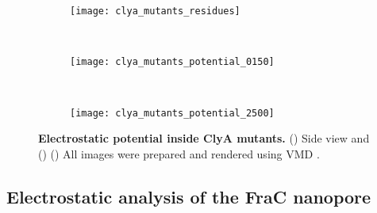 \begin{figure*}[t]
  \centering
  \medskip

  \begin{subfigure}[t]{120mm}
    \centering
    \caption{}\vspace{-5mm}\hspace{1.5mm}\label{fig:clya_mutants_residues}
    \texttt{[image: clya\_mutants\_residues]}
  \end{subfigure}
  \\ \vspace{-2mm}
  \begin{subfigure}[t]{120mm}
    \centering
    \caption{}\vspace{-2.5mm}\hspace{1.5mm}\label{fig:clya_mutants_potential_0150}
    \texttt{[image: clya\_mutants\_potential\_0150]}
  \end{subfigure}
  \\ \vspace{0mm}
  \begin{subfigure}[t]{120mm}
    \centering
    \caption{}\vspace{-2.5mm}\hspace{1.5mm}\label{fig:clya_mutants_potential_2500}
    \texttt{[image: clya\_mutants\_potential\_2500]}
  \end{subfigure}

\caption[Electrostatic potential inside ClyA mutants.]{%
  \textbf{Electrostatic potential inside ClyA mutants.}
  ()
  Side view and 
  ()
  ()
  All images were prepared and rendered using VMD \cite{Humphrey-1996,Stone-1998}.
  }\label{fig:clya_mutants}
\end{figure*}


\subsection{Electrostatic analysis of the FraC nanopore}
%


